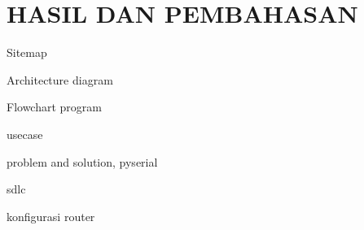 
\chapter{HASIL DAN PEMBAHASAN}

Sitemap

Architecture diagram

Flowchart program

usecase

problem and solution, pyserial

sdlc

konfigurasi router
